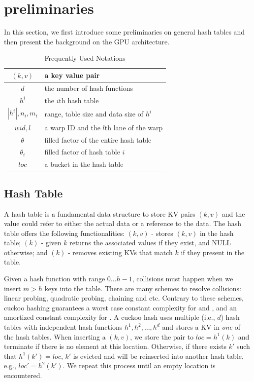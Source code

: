 \section{preliminaries}\label{sec:pre}
In this section, we first introduce some preliminaries on general hash tables and then present the background on the GPU architecture. 

\begin{table}
	\centering
	\caption{Frequently Used Notations}
	\vspace{-1.5em}
	\label{tbl:stat:datasets}
	\begin{tabular}{|c|l|}
		\hline
		$(k,v)$ & a key value pair \\ \hline
		$d$		& the number of hash functions \\ \hline
		$h^i$	& the $i$th hash table \\ \hline
		$|h^i|,n_i,m_i$	& range, table size and data size of $h^i$ \\ \hline
		$wid,l$	& a warp ID and the $l$th lane of the warp \\ \hline
		$\theta$& filled factor of the entire hash table \\ \hline
		$\theta_i$& filled factor of hash table $i$ \\ \hline
		$loc$	& a bucket in the hash table \\ \hline
	\end{tabular}
\end{table}

\subsection{Hash Table}
A hash table is a fundamental data structure to store KV pairs $(k,v)$ and the value could refer to either the actual data or a reference to the data.
The hash table offers the following functionalities: $(k,v)$ - stores $(k,v)$ in the hash table; $(k)$ - given $k$ returns the associated values if they exist, and NULL otherwise; and $(k)$ - removes existing KVs that match $k$ if they present in the table.

Given a hash function with range $0 \ldots h-1$, collisions must happen when we insert $m>h$ keys into the table. There are many schemes to resolve collisions: linear probing, quadratic probing, chaining and etc. Contrary to these schemes, cuckoo hashing \cite{pagh2004cuckoo} guarantees a worst case constant complexity for  and ,  and an amortized constant complexity for . A cuckoo hash uses multiple (i.e., $d$) hash tables with independent hash functions $h^1,h^2,\ldots,h^d$ and stores a KV in \emph{one} of the hash tables. When inserting a $(k,v)$, we store the pair to $loc=h^1(k)$ and terminate if there is no element at this location. Otherwise, if there exists $k'$ such that $h^1(k')=loc$, $k'$ is evicted and will be reinserted into another hash table, e.g., $loc'=h^2(k')$.
We repeat this process until an empty location is encountered.

